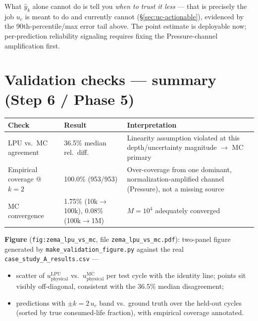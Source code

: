 \documentclass[11pt]{article}
\begin{document}
What $\hat y_k$ alone cannot do is tell you \emph{when to trust it less}
--- that is precisely the job $u_c$ is meant to do and currently cannot
(\S\ref{sec:uc-actionable}), evidenced by the 90th-percentile/max error
tail above. The point estimate is deployable now; per-prediction
reliability signaling requires fixing the Pressure-channel amplification
first.

\section{Validation checks --- summary (Step 6 / Phase 5)}
\label{sec:validation}

\begin{center}
\begin{tabular}{@{}p{4.4cm}p{3.4cm}p{6.8cm}@{}}
\toprule
Check & Result & Interpretation \\
\midrule
LPU vs.\ MC agreement & 36.5\% median rel.\ diff. & Linearity assumption
violated at this depth/uncertainty magnitude $\rightarrow$ MC primary \\
Empirical coverage @ $k=2$ & 100.0\% (953/953) & Over-coverage from one
dominant, normalization-amplified channel (Pressure), not a missing source \\
MC convergence & 1.75\% (10k$\to$100k), 0.08\% (100k$\to$1M) & $M=10^4$
adequately converged \\
\bottomrule
\end{tabular}
\end{center}

\textbf{Figure} (\texttt{fig:zema\allowbreak\_lpu\allowbreak\_vs\allowbreak\_mc}, file
\texttt{zema\allowbreak\_lpu\allowbreak\_vs\allowbreak\_mc.pdf}): two-panel figure generated by
\texttt{make\allowbreak\_validation\allowbreak\_figure.py} against the real
\texttt{case\allowbreak\_study\allowbreak\_A\allowbreak\_results.csv} ---

\begin{itemize}
\item[(a)] scatter of $u_{\mathrm{physical}}^{\mathrm{LPU}}$ vs.\ $u_{\mathrm{physical}}^{\mathrm{MC}}$ per test cycle with the
identity line; points sit visibly off-diagonal, consistent with the 36.5\%
median disagreement;
\item[(b)] predictions with $\pm k{=}2\,u_c$ band vs.\ ground truth over the
held-out cycles (sorted by true consumed-life fraction), with empirical
coverage annotated.
\end{itemize}
\end{document}
